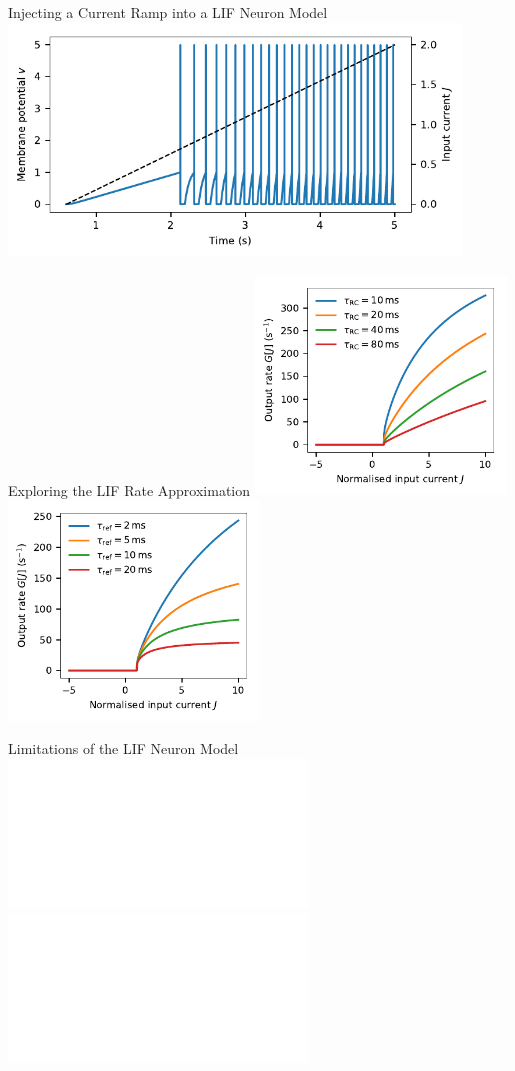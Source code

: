 \documentclass[handout,aspectratio=169]{beamer}
\begin{document}
\begin{frame}{Injecting a Current Ramp into a LIF Neuron Model}
	\centering
	\includegraphics[width=0.9\textwidth]{media/lif_neuron_ramp.pdf}

	\begin{overlayarea}{\textwidth}{1cm}
	\end{overlayarea}
\end{frame}

\begin{frame}{Exploring the LIF Rate Approximation}
	\centering
	\includegraphics[width=0.5\textwidth]{media/lif_neuron_rate_tau_rc.pdf}%
	\includegraphics[width=0.5\textwidth]{media/lif_neuron_rate_tau_ref.pdf}
\end{frame}

\begin{frame}{Limitations of the LIF Neuron Model}
	\centering
	\includegraphics<1>[width=\textwidth]{media/izhikevich_whichmod_figure1.pdf}
	\includegraphics<2>[width=\textwidth]{media/izhikevich_whichmod_figure2.pdf}
\end{frame}
\end{document}

